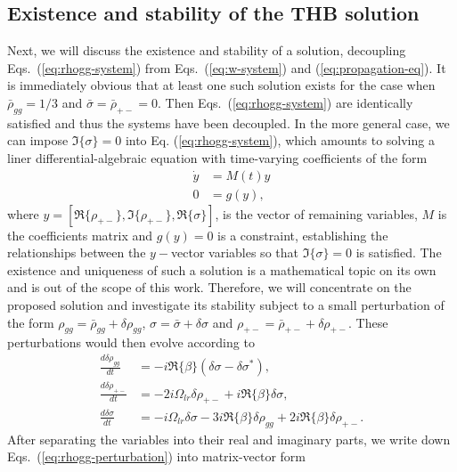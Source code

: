 \documentclass[onecolumn,secnumarabic,amssymb, nobibnotes, aip, prd]{revtex4-1}
\begin{document}
\subsection{Existence and stability of the THB solution}
\label{subsec:sup-existence}
Next, we will discuss the existence and stability of a solution, decoupling Eqs.~(\ref{eq:rhogg-system}) from Eqs.~(\ref{eq:w-system}) and (\ref{eq:propagation-eq}). It is immediately obvious that at least one such solution exists for the case when $\bar\rho_{gg} = 1/3$ and $\bar\sigma = \bar\rho_{+-} = 0$. Then Eqs.~(\ref{eq:rhogg-system}) are identically satisfied and thus the systems have been decoupled. In the more general case, we can impose $\Im\{\sigma\}=0$ into Eq. (\ref{eq:rhogg-system}), which amounts to solving a liner differential-algebraic equation with time-varying coefficients of the form 
\begin{subequations}
	\begin{align}
	\dot{y} &= M(t)y \label{eq:diffequation} \\
	0 &= g(y) \label{eq:algebraicequation},
	\end{align}
\end{subequations}
where $y = [\Re\{\rho_{+-}\},\Im\{\rho_{+-}\},\Re\{\sigma\}]$, is the vector of remaining variables, $M$ is the coefficients matrix and $g(y) =0 $ is a constraint, establishing the relationships between the $y-$vector variables so that $\Im\{\sigma\} = 0$ is satisfied. The existence and uniqueness of such a solution is a mathematical topic on its own and is out of the scope of this work. Therefore, we will concentrate on the proposed solution and investigate its stability subject to a small perturbation of the form $\rho_{gg}=\bar{\rho}_{gg}+\delta\rho_{gg}$, $\sigma = \bar{\sigma} + \delta\sigma$ and $\rho_{+-} = \bar{\rho}_{+-} + \delta\rho_{+-}$. These perturbations would then evolve according to 
\begin{subequations}
	\label{eq:rhogg-perturbation}
	\begin{align}
	\frac{d \delta\rho_{gg}}{dt} &= - i\Re\{\beta\}(\delta\sigma-\delta\sigma^*), \\
	\frac{d \delta\rho_{+-}}{dt} &= -2i\Omega_{lr}\delta\rho_{+-}+i\Re\{\beta\}\delta\sigma,\\
	\frac{d \delta\sigma}{dt} &= -i\Omega_{lr}\delta\sigma-3i\Re\{\beta\}\delta\rho_{gg}+2i\Re\{\beta\}\delta\rho_{+-}.
	\end{align}
\end{subequations}
After separating the variables into their real and imaginary parts, we write down Eqs.~(\ref{eq:rhogg-perturbation}) into matrix-vector form 
\end{document}
